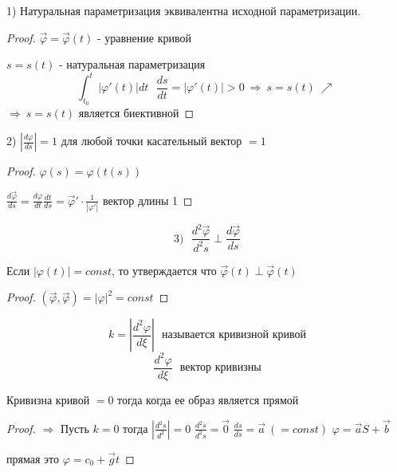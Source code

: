 \begin{block}[Свойства]
  1) Натуральная параметризация эквивалентна исходной параметризации.

  \begin{proof}
    $\vec \varphi = \vec \varphi(t)$ - уравнение кривой

    $s = s(t)$ - натуральная параметризация
    $$
    \int_{t_0}^{t} |\varphi'(t)| dt ~~~
    \frac{ds}{dt} = |\varphi'(t)| > 0 ~ \Rightarrow ~ s = s(t) ~ \nearrow ~
    $$
    $\Rightarrow ~ s = s(t)$ является биективной
  \end{proof}

  2) $\left| \frac{d\varphi}{ds} \right| = 1$ для любой точки касательный
  вектор $= 1$

  \begin{proof}
    $\varphi(s) = \varphi (t(s))$

    $\frac{d\vec \varphi}{ds} = \frac{d\varphi}{dt} \frac{dt}{ds} =
    \vec \varphi' \cdot \frac{1}{|\varphi'|}$ вектор длины 1
  \end{proof}

  $$
  3) ~~~  \frac{d^2 \vec \varphi}{d^2 s} \perp \frac{d\vec \varphi}{ds}
  $$

  \begin{block}[Лемма]
    Если $|\varphi(t)| = const$, то утверждается что $\vec \varphi(t) \perp
    \vec \varphi(t)$
  \end{block}

  \begin{proof}
    $(\vec \varphi, \vec \varphi) = |\varphi|^2 = const$
  \end{proof}
  $$
  k =
  \left|
    \frac{d^2 \varphi}{d \xi}
  \right| ~~~
  \text{называется кривизной кривой}
  $$
  $$
    \frac{d^2 \varphi}{d \xi} ~~~ \text{вектор кривизны}
  $$
\end{block}

\begin{theorem}
  Кривизна кривой $= 0$ тогда когда ее образ является прямой
\end{theorem}

\begin{proof}
  $\Rightarrow$ Пусть $k = 0$ тогда $\left| \frac{d^2 s}{d^2} \right| = 0$
  $\frac{d^2 s}{d^2 s} = \vec 0$ $\frac{d s}{d s} = \vec a ~ (=const)$
  $\varphi = \vec a S + \vec b$

  прямая это $\varphi = c_0 + \vec g t$
\end{proof}